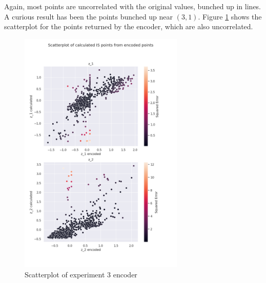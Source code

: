 Again, most points are uncorrelated with the original values, bunched up in lines. A curious result has been the points bunched up near $(3, 1)$. Figure \ref{fig:scatter_enc_exp3} shows the scatterplot for the points returned by the encoder, which are also uncorrelated.

\begin{figure}[H]
    \centering
    \includegraphics[width=0.7\textwidth]{Cap5/scatterplot_enc3}
    \caption{Scatterplot of experiment 3 encoder}
    \label{fig:scatter_enc_exp3}
\end{figure}